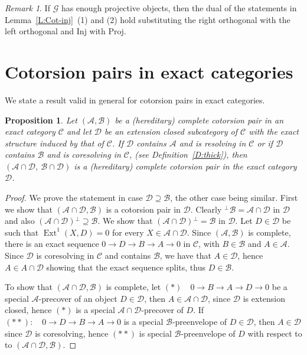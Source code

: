 \documentclass[11pt,a4paper,reqno]{amsart}
\newcommand{\wrt}{with respect to }
\newcommand{\Ext}{\operatorname{Ext}}
\newcommand{\A}{\mathcal{A}}
\newcommand{\B}{\mathcal{B}}
\newcommand{\C}{\mathcal{C}}
\newcommand{\D}{\mathcal{D}}
\newcommand{\G}{\mathcal{G}}
\newcommand{\Inj}{\mathrm{Inj}}
\newcommand{\Proj}{\mathrm{Proj}}
\theoremstyle{plain}
\newtheorem{prop}[thm]{Proposition}
\theoremstyle{definition}
\theoremstyle{remark}
\newtheorem{rem}[thm]{Remark}
\begin{document}
%
%
%
%
%
%
%
%
%
\begin{rem} If  $\G$ has enough projective objects, then the dual of the statements in Lemma~\ref{L:Cot-inj}~(1) and (2) hold  substituting the right orthogonal with the left orthogonal and $\Inj$ with $\Proj$.
\end{rem}


%
%
%
%
%
%
%
%
%
%
%
%
%
%
%
%


 \section{Cotorsion pairs in exact categories}

 We state a result valid in general for cotorsion pairs in exact categories.
 \begin{prop}\label{P:inducing} Let $(\A, \B)$ be a (hereditary) complete cotorsion pair in an exact category $\C$ and let $\D$ be an extension closed subcategory of $\C$ with the exact structure induced by that of $\C$. If $\D$ contains $\A$ and is resolving in $\C$ or if $\D$ contains $\B$ and is coresolving in $\C$, (see Definition~\ref{D:thick}), then $(\A\cap\D, \ \B\cap\D)$ is a (hereditary) complete cotorsion pair in the exact category $\D$.

 \end{prop}
 \begin{proof} We prove the statement in  case $\D\supseteq \B$, the other case being similar. First we show that $(\A\cap\D, \B)$ is a cotorsion pair in $\D$.
 Clearly ${}^\perp{}\B= \A\cap \D$ in $\D$ and also $(\A\cap \D){}^\perp{} \supseteq \B$. We show that $(\A\cap \D){}^\perp{} =\B$ in $\D$.
 Let $D\in \D$ be such that $\Ext^1(X, D)=0$ for every $X\in \A\cap \D$. Since $(\A, \B)$ is complete, there is an exact sequence $0\to D\to B\to A\to 0$ in $\C$, with $B\in \B$ and $A\in \A$. Since $\D$ is coresolving  in $\C$ and contains $\B$, we have that $A\in \D$, hence $A\in A\cap\D$ showing that the exact sequence splits, thus $D\in \B$.

To show that $(\A\cap\D, \B)$ is complete, let $(\ast)\quad 0\to B\to A\to D\to 0$ be a special $\A $-precover of an object $D\in \D$, then $A\in \A\cap\D$, since $\D$ is extension closed, hence $(\ast)$ is a special $\A\cap \D $-precover of $D$. If $ (\ast\ast):\quad 0\to D\to B\to A\to 0$ is a special $\B $-preenvelope of $D\in \D$, then $A\in \D$ since $\D$ is coresolving, hence $(\ast\ast)$ is  special $\B$-preenvelope of $D$ \wrt to  $(\A\cap\D, \B)$. \end{proof}
\end{document}
